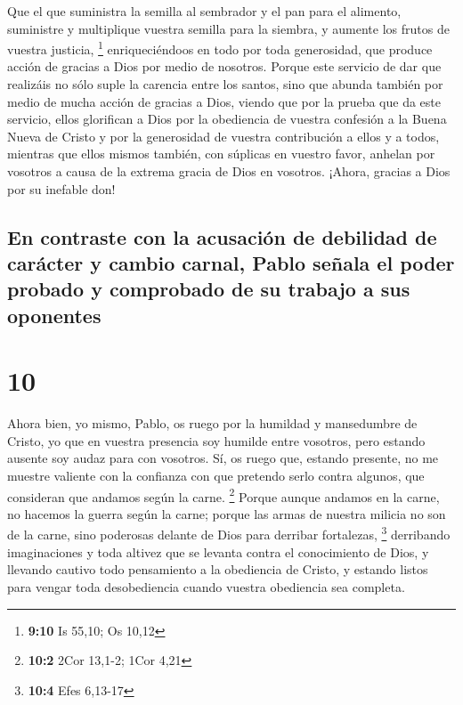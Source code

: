  Que el que suministra la semilla al sembrador y el pan
para el alimento, suministre y multiplique vuestra semilla para la
siembra, y aumente los frutos de vuestra justicia, \footnote{\textbf{9:10}
  Is 55,10; Os 10,12}  enriqueciéndoos en todo por toda
generosidad, que produce acción de gracias a Dios por medio de nosotros.
 Porque este servicio de dar que realizáis no sólo suple
la carencia entre los santos, sino que abunda también por medio de mucha
acción de gracias a Dios,  viendo que por la prueba que
da este servicio, ellos glorifican a Dios por la obediencia de vuestra
confesión a la Buena Nueva de Cristo y por la generosidad de vuestra
contribución a ellos y a todos,  mientras que ellos
mismos también, con súplicas en vuestro favor, anhelan por vosotros a
causa de la extrema gracia de Dios en vosotros.  ¡Ahora,
gracias a Dios por su inefable don!

\hypertarget{en-contraste-con-la-acusaciuxf3n-de-debilidad-de-caruxe1cter-y-cambio-carnal-pablo-seuxf1ala-el-poder-probado-y-comprobado-de-su-trabajo-a-sus-oponentes}{%
\subsection{En contraste con la acusación de debilidad de carácter y
cambio carnal, Pablo señala el poder probado y comprobado de su trabajo
a sus
oponentes}\label{en-contraste-con-la-acusaciuxf3n-de-debilidad-de-caruxe1cter-y-cambio-carnal-pablo-seuxf1ala-el-poder-probado-y-comprobado-de-su-trabajo-a-sus-oponentes}}

\hypertarget{section-9}{%
\section{10}\label{section-9}}

 Ahora bien, yo mismo, Pablo, os ruego por la humildad y
mansedumbre de Cristo, yo que en vuestra presencia soy humilde entre
vosotros, pero estando ausente soy audaz para con vosotros.
 Sí, os ruego que, estando presente, no me muestre
valiente con la confianza con que pretendo serlo contra algunos, que
consideran que andamos según la carne. \footnote{\textbf{10:2} 2Cor
  13,1-2; 1Cor 4,21}  Porque aunque andamos en la carne,
no hacemos la guerra según la carne;  porque las armas de
nuestra milicia no son de la carne, sino poderosas delante de Dios para
derribar fortalezas, \footnote{\textbf{10:4} Efes 6,13-17}
 derribando imaginaciones y toda altivez que se levanta
contra el conocimiento de Dios, y llevando cautivo todo pensamiento a la
obediencia de Cristo,  y estando listos para vengar toda
desobediencia cuando vuestra obediencia sea completa.

